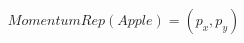 \documentclass[preview]{standalone}
\begin{document}
\begin{align*}
MomentumRep(Apple)=(p_x, p_y)
\end{align*}
\end{document}
